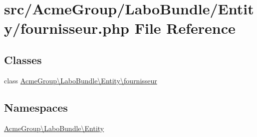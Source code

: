 \hypertarget{fournisseur_8php}{\section{src/\+Acme\+Group/\+Labo\+Bundle/\+Entity/fournisseur.php File Reference}
\label{fournisseur_8php}
}
\subsection*{Classes}
\begin{DoxyCompactItemize}
\item 
class \hyperlink{class_acme_group_1_1_labo_bundle_1_1_entity_1_1fournisseur}{Acme\+Group\textbackslash{}\+Labo\+Bundle\textbackslash{}\+Entity\textbackslash{}fournisseur}
\end{DoxyCompactItemize}
\subsection*{Namespaces}
\begin{DoxyCompactItemize}
\item 
 \hyperlink{namespace_acme_group_1_1_labo_bundle_1_1_entity}{Acme\+Group\textbackslash{}\+Labo\+Bundle\textbackslash{}\+Entity}
\end{DoxyCompactItemize}
